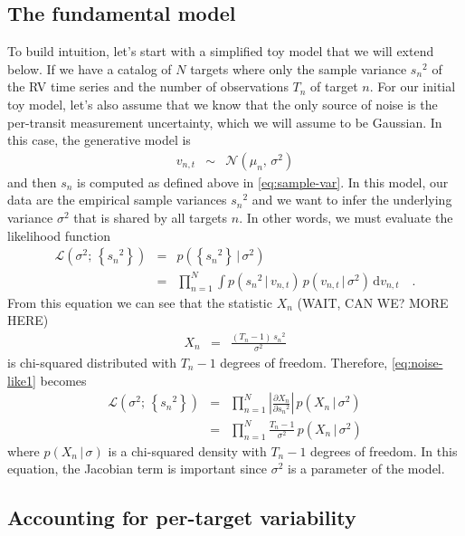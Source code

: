 \documentclass[modern, letterpaper]{aastex63}
\newcommand{\dd}{\ensuremath{\,\mathrm{d}}}
\begin{document}
\subsection{The fundamental model}

To build intuition, let's start with a simplified toy model that we will extend below.
If we have a catalog of $N$ targets where only the sample variance ${s_n}^2$ of the RV time series and the number of observations $T_n$ of target $n$.
For our initial toy model, let's also assume that we know that the only source of noise is the per-transit measurement uncertainty, which we will assume to be Gaussian.
In this case, the generative model is
\begin{eqnarray}
	v_{n,t} &\sim& \mathcal{N}(\mu_n,\,\sigma^2)
\end{eqnarray}
and then $s_n$ is computed as defined above in \autoref{eq:sample-var}.
In this model, our data are the empirical sample variances ${s_n}^2$ and we want to infer the underlying variance $\sigma^2$ that is shared by all targets $n$.
In other words, we must evaluate the likelihood function
\begin{eqnarray}
	\label{eq:noise-like1}
	\mathcal{L}(\sigma^2;\,\left\{{s_n}^2\right\}) &=& p(\left\{{s_n}^2\right\}\,|\,\sigma^2) \\
	&=& \prod_{n=1}^N\int p({s_n}^2\,|\,v_{n,t})\,p(v_{n,t}\,|\,\sigma^2) \dd v_{n,t}\quad.
\end{eqnarray}
From this equation we can see that the statistic $X_n$ (WAIT, CAN WE? MORE HERE)
\begin{eqnarray}
	X_n &=& \frac{(T_n - 1)\,{s_n}^2}{\sigma^2}
\end{eqnarray}
is chi-squared distributed with $T_n - 1$ degrees of freedom.
Therefore, \autoref{eq:noise-like1} becomes
\begin{eqnarray}
	\label{eq:noise-like2}
	\mathcal{L}(\sigma^2;\,\left\{{s_n}^2\right\}) &=& \prod_{n=1}^N \left|\frac{\partial X_n}{\partial {s_n}^2}\right|\,p(X_n\,|\,\sigma^2) \nonumber\\
	&=& \prod_{n=1}^N \frac{T_n - 1}{\sigma^2}\,p(X_n\,|\,\sigma^2)
\end{eqnarray}
where $p(X_n\,|\,\sigma)$ is a chi-squared density with $T_n - 1$ degrees of freedom.
In this equation, the Jacobian term is important since $\sigma^2$ is a parameter of the model.

\subsection{Accounting for per-target variability}
\end{document}
